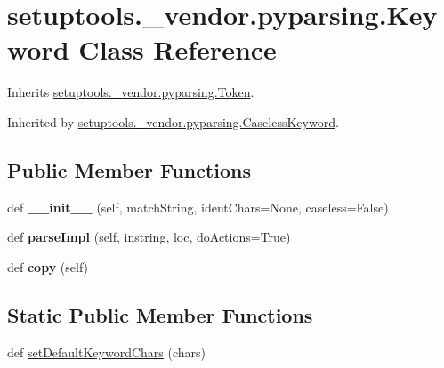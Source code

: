 \hypertarget{classsetuptools_1_1__vendor_1_1pyparsing_1_1_keyword}{}\section{setuptools.\+\_\+vendor.\+pyparsing.\+Keyword Class Reference}
\label{classsetuptools_1_1__vendor_1_1pyparsing_1_1_keyword}


Inherits \hyperlink{classsetuptools_1_1__vendor_1_1pyparsing_1_1_token}{setuptools.\+\_\+vendor.\+pyparsing.\+Token}.



Inherited by \hyperlink{classsetuptools_1_1__vendor_1_1pyparsing_1_1_caseless_keyword}{setuptools.\+\_\+vendor.\+pyparsing.\+Caseless\+Keyword}.

\subsection*{Public Member Functions}
\begin{DoxyCompactItemize}
\item 
\mbox{\label{classsetuptools_1_1__vendor_1_1pyparsing_1_1_keyword_a7037e6d7d6b3273f381766cb7d803178}} 
def {\bfseries \+\_\+\+\_\+init\+\_\+\+\_\+} (self, match\+String, ident\+Chars=None, caseless=False)
\item 
\mbox{\label{classsetuptools_1_1__vendor_1_1pyparsing_1_1_keyword_a9cbc8c5da7a96bb2fe7d9a9d6f183e94}} 
def {\bfseries parse\+Impl} (self, instring, loc, do\+Actions=True)
\item 
\mbox{\label{classsetuptools_1_1__vendor_1_1pyparsing_1_1_keyword_a4755042f0debfca0e86a468001a77957}} 
def {\bfseries copy} (self)
\end{DoxyCompactItemize}
\subsection*{Static Public Member Functions}
\begin{DoxyCompactItemize}
\item 
def \hyperlink{classsetuptools_1_1__vendor_1_1pyparsing_1_1_keyword_a569380346ac0c70c38a8c46ae2a311d1}{set\+Default\+Keyword\+Chars} (chars)
\end{DoxyCompactItemize}
